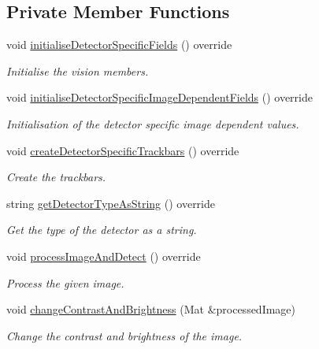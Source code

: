\subsection*{\-Private \-Member \-Functions}
\begin{DoxyCompactItemize}
\item 
void \hyperlink{classmultiscale_1_1analysis_1_1RegionDetector_aee6bb117ea0ef98b8e333ac33d17962c}{initialise\-Detector\-Specific\-Fields} () override
\begin{DoxyCompactList}\small\item\em \-Initialise the vision members. \end{DoxyCompactList}\item 
void \hyperlink{classmultiscale_1_1analysis_1_1RegionDetector_afc8382c3838e476b0c7a5a9794ed42e5}{initialise\-Detector\-Specific\-Image\-Dependent\-Fields} () override
\begin{DoxyCompactList}\small\item\em \-Initialisation of the detector specific image dependent values. \end{DoxyCompactList}\item 
void \hyperlink{classmultiscale_1_1analysis_1_1RegionDetector_a904af350ef7e988bb10970cac7b9491a}{create\-Detector\-Specific\-Trackbars} () override
\begin{DoxyCompactList}\small\item\em \-Create the trackbars. \end{DoxyCompactList}\item 
string \hyperlink{classmultiscale_1_1analysis_1_1RegionDetector_a3bdfa4df6eb1b2ab36fd490eaae8747c}{get\-Detector\-Type\-As\-String} () override
\begin{DoxyCompactList}\small\item\em \-Get the type of the detector as a string. \end{DoxyCompactList}\item 
void \hyperlink{classmultiscale_1_1analysis_1_1RegionDetector_ae47319444db34d72d4316f49f965b69d}{process\-Image\-And\-Detect} () override
\begin{DoxyCompactList}\small\item\em \-Process the given image. \end{DoxyCompactList}\item 
void \hyperlink{classmultiscale_1_1analysis_1_1RegionDetector_a92260dc64fb1de8f72df3a7bd44e171d}{change\-Contrast\-And\-Brightness} (\-Mat \&processed\-Image)
\begin{DoxyCompactList}\small\item\em \-Change the contrast and brightness of the image. \end{DoxyCompactList}\item 

\end{DoxyCompactItemize}
